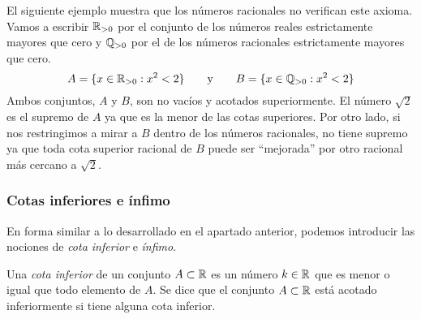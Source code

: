 \documentclass[../Teoría.root.tex]{subfiles}
\begin{document}
El siguiente ejemplo muestra que los números racionales no verifican este axioma.
Vamos a escribir \(\mathbb{R}_{>0}\) por el conjunto de los números reales estrictamente mayores que cero y \(\mathbb{Q}_{>0}\) por el de los números racionales estrictamente mayores que cero.
\[A = \{x \in \mathbb{R}_{>0} : x^2 < 2\}\qquad\text{y}\qquad B = \{x \in \mathbb{Q}_{>0} : x^2 < 2\}\]
Ambos conjuntos, \(A\) y \(B\), son no vacíos y acotados superiormente.
El número \(\sqrt{2}\) es el supremo de \(A\) ya que es la menor de las cotas superiores.
Por otro lado, si nos restringimos a mirar a \(B\) dentro de los números racionales, no tiene supremo ya que toda cota superior racional de \(B\) puede ser “mejorada” por otro racional más cercano a \(\sqrt{2}\).
\subsubsection{Cotas inferiores e ínfimo}
En forma similar a lo desarrollado en el apartado anterior, podemos introducir las nociones de \textit{cota inferior} e \textit{ínfimo}.

Una \textit{cota inferior} de un conjunto \(A \subset \mathbb{R}\) es un número \(k \in \mathbb{R}\) que es menor o igual que todo elemento de \(A\).
Se dice que el conjunto \(A \subset \mathbb{R}\) está acotado inferiormente si tiene alguna cota inferior.
\end{document}
